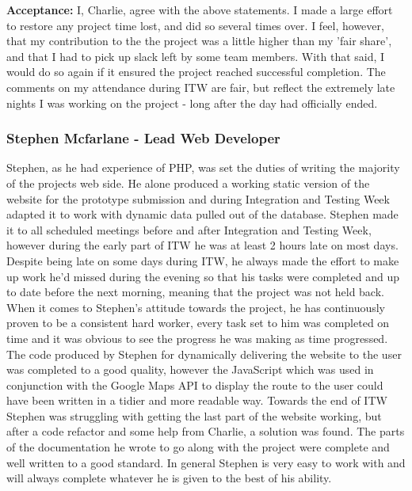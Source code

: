 \documentclass{article}
\begin{document}
		{\bf Acceptance:} I, Charlie, agree with the above statements. I made a large effort to restore any project time lost, and did so several times over. I feel, however, that my contribution to the the project was a little higher than my 'fair share', and that I had to pick up slack left by some team members. With that said, I would do so again if it ensured the project reached successful completion. The comments on my attendance during ITW are fair, but reflect the extremely late nights I was working on the project - long after the day had officially ended.


		\subsubsection{Stephen Mcfarlane - Lead Web Developer}
		Stephen, as he had experience of PHP, was set the duties of writing the majority of the projects web side. He alone produced a working static version of the website for the prototype submission and during Integration and Testing Week adapted it to work with dynamic data pulled out of the database. Stephen made it to all scheduled meetings before and after Integration and Testing Week, however during the early part of ITW he was at least 2 hours late on most days. Despite being late on some days during ITW, he always made the effort to make up work he'd missed during the evening so that his tasks were completed and up to date before the next morning, meaning that the project was not held back. When it comes to Stephen's attitude towards the project, he has continuously proven to be a consistent hard worker, every task set to him was completed on time and it was obvious to see the progress he was making as time progressed. \\
		
		The code produced by Stephen for dynamically delivering the website to the user was completed to a good quality, however the JavaScript which was used in conjunction with the Google Maps API to display the route to the user could have been written in a tidier and more readable way. Towards the end of ITW Stephen was struggling with getting the last part of the website working, but after a code refactor and some help from Charlie, a solution was found. The parts of the documentation he wrote to go along with the project were complete and well written to a good standard. In general Stephen is very easy to work with and will always complete whatever he is given to the best of his ability. \\
		
\end{document}
